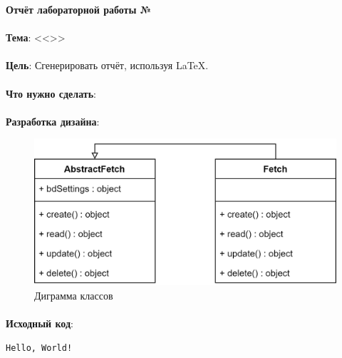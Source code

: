 \documentclass[12pt, a4paper, simple]{eskdtext}
\def \gpiDocTopic {Отчёт лабораторной работы №\gpiDocNum}
\begin{document}
    
    \begin{center}
        \textbf{\gpiDocTopic}
    \end{center}

    \paragraph{} \textbf{Тема}: <<\gpiTopicRep>>

    \paragraph{} \textbf{Цель}: Сгенерировать отчёт, используя \LaTeX.

    \paragraph{} \textbf{Что нужно сделать}:

    \paragraph{} \textbf{Разработка дизайна}:

    \begin{figure}[!h]
        \centering
        \includegraphics[]
            {_assets/ClassDiagram.png}
        \caption{Диграмма классов}
    \end{figure}

    \paragraph{} \textbf{Исходный код}: 

    

    \begin{lstlisting}[caption=Вывод в консоль]
 Hello, World!
\end{lstlisting}
\end{document}
